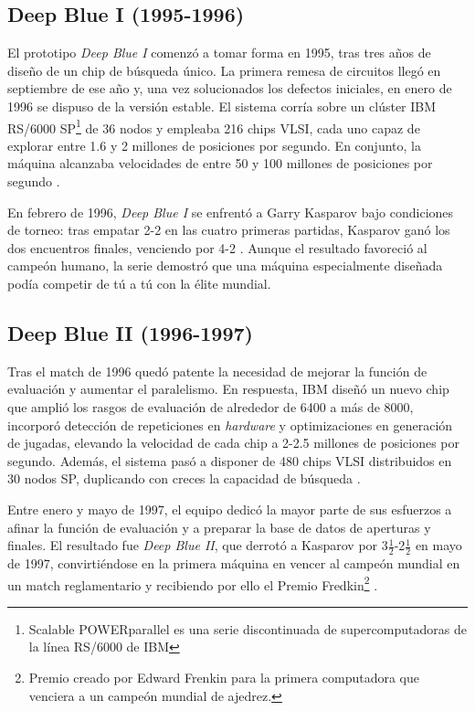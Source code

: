 \documentclass[a4paper, 12pt]{article}
\begin{document}
\subsection{Deep Blue I (1995-1996)}

El prototipo \textit{Deep Blue I} comenzó a tomar forma en 1995, 
tras tres años de diseño de un chip de búsqueda único. La 
primera remesa de circuitos llegó en septiembre de ese año y, 
una vez solucionados los defectos iniciales, en enero de 1996 se 
dispuso de la versión estable. El sistema corría sobre un 
clúster IBM RS/6000 SP\footnote{Scalable POWERparallel es una serie discontinuada de supercomputadoras de la línea RS/6000 de IBM} 
de 36 nodos y empleaba 216 chips VLSI, 
cada uno capaz de explorar entre 1.6 y 2 millones de posiciones 
por segundo. En conjunto, la máquina alcanzaba velocidades de 
entre 50 y 100 millones de posiciones por segundo \cite{campbell2002deep}.    

En febrero de 1996, \textit{Deep Blue I} se enfrentó a Garry 
Kasparov bajo condiciones de torneo: tras empatar 2-2 en las 
cuatro primeras partidas, Kasparov ganó los dos encuentros 
finales, venciendo por 4-2 \cite{campbell2002deep}. Aunque el 
resultado favoreció al campeón humano, la serie demostró que una 
máquina especialmente diseñada podía competir de tú a tú con la 
élite mundial.

\subsection{Deep Blue II (1996-1997)}

Tras el match de 1996 quedó patente la necesidad de mejorar la 
función de evaluación y aumentar el paralelismo. En respuesta, 
IBM diseñó un nuevo chip que amplió los rasgos de evaluación de 
alrededor de 6400 a más de 8000, incorporó detección de 
repeticiones en \emph{hardware} y optimizaciones en generación de 
jugadas, elevando la velocidad de cada chip a 2-2.5 millones de 
posiciones por segundo. Además, el sistema pasó a disponer de 
480 chips VLSI distribuidos en 30 nodos SP, duplicando con 
creces la capacidad de búsqueda \cite{campbell2002deep}.

Entre enero y mayo de 1997, el equipo dedicó la mayor parte de 
sus esfuerzos a afinar la función de evaluación y a preparar la 
base de datos de aperturas y finales. El resultado fue 
\textit{Deep Blue II}, que derrotó a Kasparov por 3\(\frac{1}{2}\)-2\(\frac{1}{2}\) en mayo
de 1997, convirtiéndose en la primera máquina en vencer al 
campeón mundial en un match reglamentario y recibiendo por 
ello el Premio Fredkin\footnote{Premio creado por Edward Frenkin para la primera computadora que venciera a un campeón mundial de ajedrez.} \cite{campbell2002deep}.
\end{document}
